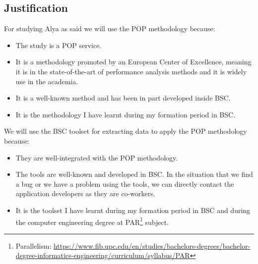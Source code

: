 \subsection{Justification}
\label{sec:justification}
For studying Alya as said we will use the POP methodology because:

\begin{itemize}
  \item The study is a POP service.
  \item It is a methodology promoted by an European Center of Excellence, meaning it is in the state-of-the-art of performance analysis methods and it is widely use in the academia.
  \item It is a well-known method and has been in part developed inside BSC.
  \item It is the methodology I have learnt during my formation period in BSC.
\end{itemize}

We will use the BSC toolset for extracting data to apply the POP methodology because:

\begin{itemize}
  \item They are well-integrated with the POP methodology.
  \item The tools are well-known and developed in BSC. In the situation that we find a bug or we have a problem using the tools, we can directly contact the application developers as they are co-workers.
  \item It is the toolset I have learnt during my formation period in BSC and during the computer engineering degree at PAR\footnote{Parallelism: \url{https://www.fib.upc.edu/en/studies/bachelors-degrees/bachelor-degree-informatics-engineering/curriculum/syllabus/PAR}} subject.
\end{itemize}

